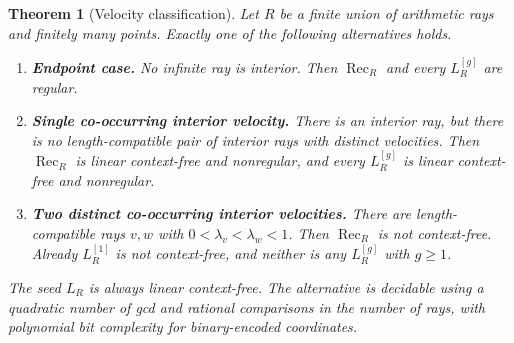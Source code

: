 \documentclass[11pt,letterpaper]{article}
\newtheorem{theorem}{Theorem}[section]
\theoremstyle{definition}
\theoremstyle{remark}
\newcommand{\rec}{\operatorname{Rec}}
\newcommand{\gen}[2]{#1^{[#2]}}
\begin{document}
\begin{theorem}[Velocity classification]\label{ccc:cl:thm:trichotomy}
Let $R$ be a finite union of arithmetic rays and finitely many points.
Exactly one of the following alternatives holds.
\begin{enumerate}[label=\textup{\textbf{\arabic*.}}]
\item \textbf{Endpoint case.} No infinite ray is interior.
Then $\rec_R$ and every $\gen{L_R}g$ are regular.
\item \textbf{Single co-occurring interior velocity.} There is an interior
ray, but there is no length-compatible pair of interior rays with distinct
velocities. Then $\rec_R$ is linear context-free and nonregular, and every
$\gen{L_R}g$ is linear context-free and nonregular.
\item \textbf{Two distinct co-occurring interior velocities.} There are
length-compatible rays $v,w$ with
$0<\lambda_v<\lambda_w<1$. Then $\rec_R$ is not context-free.
Already $\gen{L_R}1$ is not context-free, and neither is any
$\gen{L_R}g$ with $g\ge1$.
\end{enumerate}
The seed $L_R$ is always linear context-free. The alternative is decidable
using a quadratic number of gcd and rational comparisons in the number of
rays, with polynomial bit complexity for binary-encoded coordinates.
\end{theorem}
\end{document}
